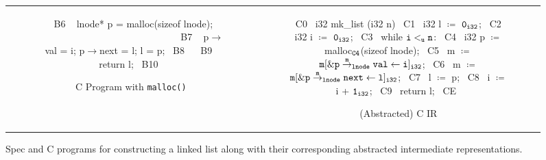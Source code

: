 \begin{figure}[H]
\begin{tabular}{cc}
\begin{subfigure}[b]{0.565\textwidth}
\begin{center}
\begin{allLangEnvScript}
{{~{\tiny \textcolor{mygray}{B6 }}~     lnode* p = malloc(sizeof lnode);                       $\phantom{m \coloneqq \mathrm{\tt m[\&\structPointer{\tt p}{m}{\tt lnode}{next} \leftarrow l]_{i32}};}$
~{\tiny \textcolor{mygray}{B7 }}~     p$\rightarrow$val = i; p$\rightarrow$next = l; l = p;
~{\tiny \textcolor{mygray}{B8 }}~   }
~{\tiny \textcolor{mygray}{B9}}~   return l;
~{\tiny \textcolor{mygray}{B10}}~ }
\end{allLangEnvScript}
\end{center}
\caption{\label{fig:llAllocC}C Program with {\tt malloc()}}
\end{subfigure}%
&
\begin{subfigure}[b]{0.435\textwidth}
\begin{center}
\begin{allLangEnvScript}
~{\tiny \textcolor{mygray}{C0}}~ i32 mk_list (i32 n) {
~{\tiny \textcolor{mygray}{C1}}~   i32 l $\coloneqq$ ${\tt 0_{i32}}$;
~{\tiny \textcolor{mygray}{C2}}~   i32 i $\coloneqq$ ${\tt 0_{i32}}$;
~{\tiny \textcolor{mygray}{C3}}~   while ${\tt i <_{u} n}$:
~{\tiny \textcolor{mygray}{C4}}~     i32 p $\coloneqq$ malloc$_{\tt C4}$(sizeof lnode);
~{\tiny \textcolor{mygray}{C5}}~     m $\coloneqq$ $\mathrm{\tt m[ \&{\tt \tt p} \overset{m}{\rightarrow}_{\tt lnode} {\tt val} \leftarrow i]_{i32}}$;
~{\tiny \textcolor{mygray}{C6}}~     m $\coloneqq$ $\mathrm{\tt m[\&{\tt \tt p} \overset{m}{\rightarrow}_{\tt lnode} {\tt next} \leftarrow l]_{i32}}$;
~{\tiny \textcolor{mygray}{C7}}~     l $\coloneqq$ p;
~{\tiny \textcolor{mygray}{C8}}~     i $\coloneqq$ i + ${\tt 1_{i32}}$;
~{\tiny \textcolor{mygray}{C9}}~   return l;
~{\tiny \textcolor{mygray}{CE}}~ }
\end{allLangEnvScript}
\end{center}
\caption{\label{fig:llAllocCIR}(Abstracted) C IR}
\end{subfigure}%
\\
\end{tabular}
\caption{\label{fig:llAllocSpecAndC}Spec and C programs for constructing a linked list along with their corresponding abstracted intermediate representations.}
\end{figure}